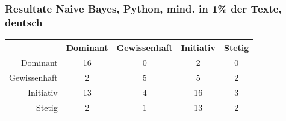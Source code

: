 \documentclass{beamer}
\begin{document}
\begin{frame}
\frametitle{Resultate Naive Bayes, Python, mind. in 1\% der Texte, deutsch}
\begin{tabular}{r|c|c|c|c|}
 &  Dominant  & Gewissenhaft & Initiativ & Stetig\\
\hline
Dominant & 16 & 0 & 2 & 0 \\
Gewissenhaft & 2 & 5 & 5 & 2\\
Initiativ & 13 & 4 & 16 & 3\\
Stetig & 2 & 1 & 13 & 2
\end{tabular}
\end{frame}
\end{document}
